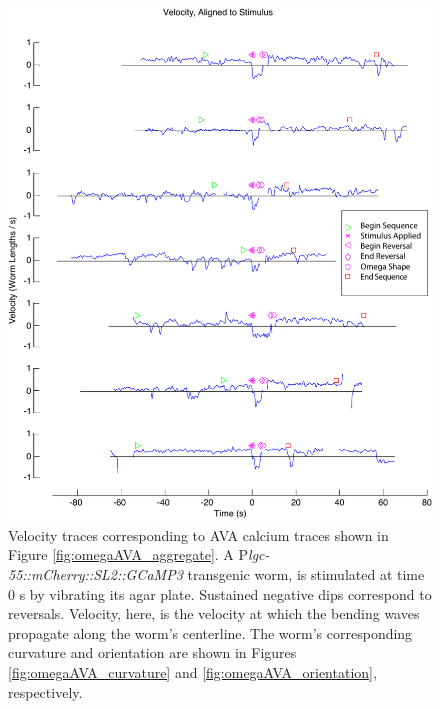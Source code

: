 \begin{figure}  %
\includegraphics[width=\textwidth]{figures/omegaAVA_velocity}
\caption[Corresponding velocity for seven sequences from four worms.]{Velocity traces corresponding to AVA calcium traces shown in Figure \ref{fig:omegaAVA_aggregate}. A P\textit{lgc-55::mCherry::SL2::GCaMP3} transgenic worm, is stimulated at time 0 s by vibrating its agar plate. Sustained negative dips correspond to reversals. Velocity, here, is the velocity at which the bending waves propagate along the worm's centerline.  The worm's corresponding curvature and orientation are shown in Figures \ref{fig:omegaAVA_curvature} and \ref{fig:omegaAVA_orientation}, respectively. \label{fig:omegaAVA_velocity}}
\end{figure}



